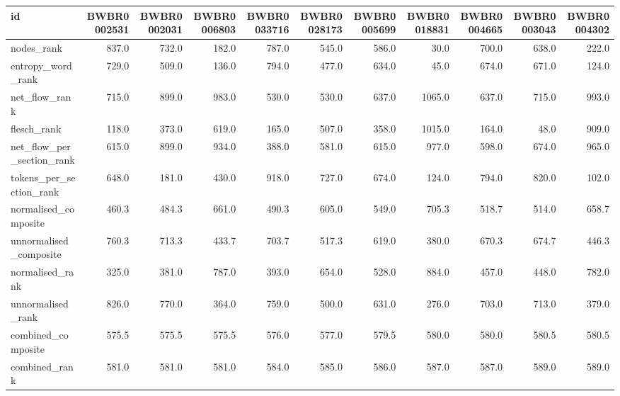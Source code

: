 \begin{tabular}{lrrrrrrrrrr}
\toprule
id & BWBR0002531 & BWBR0002031 & BWBR0006803 & BWBR0033716 & BWBR0028173 & BWBR0005699 & BWBR0018831 & BWBR0004665 & BWBR0003043 & BWBR0004302 \\
\midrule
nodes\_rank & 837.0 & 732.0 & 182.0 & 787.0 & 545.0 & 586.0 & 30.0 & 700.0 & 638.0 & 222.0 \\
\cline{1-11}
entropy\_word\_rank & 729.0 & 509.0 & 136.0 & 794.0 & 477.0 & 634.0 & 45.0 & 674.0 & 671.0 & 124.0 \\
\cline{1-11}
net\_flow\_rank & 715.0 & 899.0 & 983.0 & 530.0 & 530.0 & 637.0 & 1065.0 & 637.0 & 715.0 & 993.0 \\
\cline{1-11}
flesch\_rank & 118.0 & 373.0 & 619.0 & 165.0 & 507.0 & 358.0 & 1015.0 & 164.0 & 48.0 & 909.0 \\
\cline{1-11}
net\_flow\_per\_section\_rank & 615.0 & 899.0 & 934.0 & 388.0 & 581.0 & 615.0 & 977.0 & 598.0 & 674.0 & 965.0 \\
\cline{1-11}
tokens\_per\_section\_rank & 648.0 & 181.0 & 430.0 & 918.0 & 727.0 & 674.0 & 124.0 & 794.0 & 820.0 & 102.0 \\
\cline{1-11}
normalised\_composite & 460.3 & 484.3 & 661.0 & 490.3 & 605.0 & 549.0 & 705.3 & 518.7 & 514.0 & 658.7 \\
\cline{1-11}
unnormalised\_composite & 760.3 & 713.3 & 433.7 & 703.7 & 517.3 & 619.0 & 380.0 & 670.3 & 674.7 & 446.3 \\
\cline{1-11}
normalised\_rank & 325.0 & 381.0 & 787.0 & 393.0 & 654.0 & 528.0 & 884.0 & 457.0 & 448.0 & 782.0 \\
\cline{1-11}
unnormalised\_rank & 826.0 & 770.0 & 364.0 & 759.0 & 500.0 & 631.0 & 276.0 & 703.0 & 713.0 & 379.0 \\
\cline{1-11}
combined\_composite & 575.5 & 575.5 & 575.5 & 576.0 & 577.0 & 579.5 & 580.0 & 580.0 & 580.5 & 580.5 \\
\cline{1-11}
combined\_rank & 581.0 & 581.0 & 581.0 & 584.0 & 585.0 & 586.0 & 587.0 & 587.0 & 589.0 & 589.0 \\
\cline{1-11}
\bottomrule
\end{tabular}

